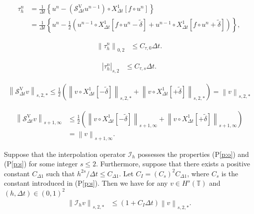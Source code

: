 \documentclass[10pt,a4paper]{amsart}
\def\norm#1#2{\left\|#2\right\|_{#1}}
\def\snorm#1#2{\left|#2\right|_{#1}}
\begin{document}
\begin{align} 
  \tau_h^n & = \frac{1}{\Delta t} \left\{u^n - (\mathcal{S}_{\Delta t}^{\mathrm{V}} u^{n - 1}) \circ {X_{\Delta t}^1} [f \circ u^n]\right\} \\ 
  & = \frac{1}{\Delta t} \left\{u^n - \frac{1}{2} ( u^{n - 1} \circ {X_{\Delta t}^1} [f \circ u^n - \tilde{\delta}] + u^{n - 1} \circ {X_{\Delta t}^1} [f \circ u^n + \tilde{\delta}]) \right\}, \label{def_tau} 
\end{align} 

\begin{align} 
  \norm{0, 2}{\tau_h^n} & \leq C_{\tau,0} \Delta t. \label{tau_0} 
\end{align} 

\begin{align} 
  \snorm{s, 2}{\tau_h^n} & \leq C_{\tau,s} \Delta t. \label{tau_s} 
\end{align} 

\begin{align} 
  \norm{s, 2, \ast}{\mathcal{S}_{\Delta t}^{\mathrm{V}} v} \leq \frac{1}{2} \left(\norm{s, 2, \ast}{v \circ {X_{\Delta t}^1}[- \tilde{\delta}]} + \norm{s, 2, \ast}{v \circ {X_{\Delta t}^1}[+ \tilde{\delta}]}\right) = \norm{s, 2, \ast}{v} \label{b7} 
\end{align} 

\begin{align} 
  \norm{s + 1, \infty}{\mathcal{S}_{\Delta t}^{\mathrm{V}} v} & \leq \frac{1}{2} \left(\norm{s + 1, \infty}{v \circ {X_{\Delta t}^1}[- \tilde{\delta}]} + \norm{s + 1, \infty}{v \circ {X_{\Delta t}^1}[+ \tilde{\delta}]}\right) \\ & = \norm{s + 1, \infty}{v}. \label{b7-2} 
\end{align} 

\begin{lemma} \label{lem:2} 
  Suppose that the interpolation operator $ \mathcal{I}_{h} $ possesses the properties (P\ref{p:o}) and (P\ref{p:s}) for some integer $ s \leq 2 $. Furthermore, suppose that there exists a positive constant $ C_{\Delta 1} $ such that $ h^{2s} / \Delta t \leq C_{\Delta 1} $. Let $ C_I = (C_s)^2 C_{\Delta 1} $, where $ C_s $ is the constant introduced in (P\ref{p:s}). Then we have for any $ v \in H^s (\mathbb{T}) $ and $ (h, \Delta t) \in (0,1)^2 $
  \begin{align} 
    \norm{s, 2, *}{\mathcal{I}_{h} v} & \leq \left(1 + C_I \Delta t \right) \norm{s, 2, *}{v}. 
  \end{align} 
\end{lemma} 
\end{document}

